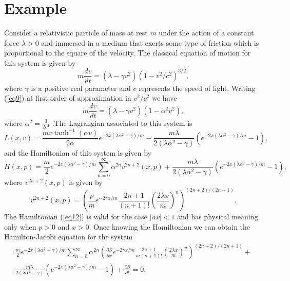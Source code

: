 \section{Example}
Consider a relativistic particle of mass at rest $m$ under the
action of a constant force $\lambda>0$ and immersed in a medium
that exerts some type of friction which is proportional to the
square of the velocity. The classical equation of motion for this
system is given by
\begin{equation}
m\frac{dv}{dt}=(\lambda-\gamma v^2)(1-v^2/c^2)^{3/2}, \label{eq9}
\end{equation}
where $\gamma$ is a positive real parameter and $c$ represents the
speed of light. Writing (\ref{eq9}) at first order of
approximation in $v^2/c^2$ we have
\begin{equation}
m\frac{dv}{dt}=(\lambda-\gamma v^2)(1-\alpha^2 v^2), \label{eq10}
\end{equation}
where $\alpha^2=\frac{3}{2c^2}$ .The Lagrangian associated to this
system is \cite{G1}
\begin{equation}
L(x,v)=\frac{mv\tanh^{-1}(\alpha v)}{2\alpha}
e^{-2x(\lambda\alpha^2-\gamma)/m}-\frac{m\lambda}{2(\lambda\alpha^2-\gamma)}\left(
e^{-2x(\lambda\alpha^2-\gamma)/m} - 1\right), \label{eq11}
\end{equation}
and the Hamiltonian of this system is given by \cite{G1}
\begin{equation}
H(x,p)= \frac{m}{2}
e^{-2x(\lambda\alpha^2-\gamma)/m}\sum_{n=0}^{\infty}\alpha^{2n}
v^{2n+2}(x,p) +\frac{m\lambda}{2(\lambda\alpha^2-\gamma)}\left(
e^{-2x(\lambda\alpha^2-\gamma)/m} - 1\right), \label{eq12}
\end{equation}
where $v^{2n+2}(x,p)$ is given by
\begin{equation}
v^{2n+2}(x,p)= \left(\frac{p}{m}e^{-2\gamma
x/m}\frac{2n+1}{(n+1)!}\left(\frac{ 2\lambda
x}{m}\right)^{n}\right)^{(2n+2)/(2n+1)}. \label{eq13}
\end{equation}
The Hamiltonian (\ref{eq12}) is valid for the case $|\alpha v|<1$
and has physical meaning only when $p>0$ and $x>0$. Once knowing
the Hamiltonian we can obtain the Hamilton-Jacobi equation for the
system
\begin{eqnarray}
\frac{m}{2}
e^{-2x(\lambda\alpha^2-\gamma)/m}\sum_{n=0}^{\infty}\alpha^{2n}\left(\frac{\partial
S }{\partial x}e^{-2\gamma x/m}\frac{2n+1}{m(n+1)!}\left(\frac{
2\lambda x}{m}\right)^{n}\right)^{(2n+2)/(2n+1)} + \nonumber\\
\frac{m\lambda}{2(\lambda\alpha^2-\gamma)}\left(
e^{-2x(\lambda\alpha^2-\gamma)/m} - 1\right) +\frac{\partial S
}{\partial t}=0,\label{eq14}
\end{eqnarray}
